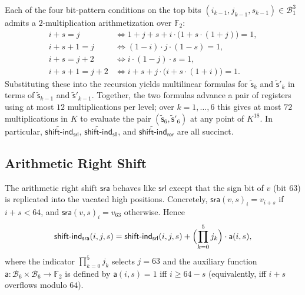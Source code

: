 \documentclass{article}
\theoremstyle{definition}
\newcommand*{\mle}{\widetilde}
\newcommand{\BB}{\mathcal{B}}
\newcommand{\FF}[1]{\mathbb{F}_{#1}}
\begin{document}
Each of the four bit-pattern conditions on the top bits $(i_{k-1}, j_{k-1}, s_{k-1}) \in \BB_1^3$ admits a $2$-multiplication arithmetization over $\FF{2}$:
\begin{align*}
  i + s = j &\iff 1 + j + s + i \cdot \bigl( 1 + s \cdot (1 + j) \bigr) = 1, \\
  i + s + 1 = j &\iff (1 - i) \cdot j \cdot (1 - s) = 1, \\
  i + s = j + 2 &\iff i \cdot (1 - j) \cdot s = 1, \\
  i + s + 1 = j + 2 &\iff i + s + j \cdot \bigl( i + s \cdot (1 + i) \bigr) = 1.
\end{align*}
Substituting these into the recursion yields multilinear formulas for $\mle{\mathsf{s}}_k$ and $\mle{\mathsf{s}}'_k$ in terms of $\mle{\mathsf{s}}_{k - 1}$ and $\mle{\mathsf{s}}'_{k - 1}$. Together, the two formulas advance a pair of registers using at most $12$ multiplications per level; over $k = 1, \ldots, 6$ this gives at most $72$ multiplications in $K$ to evaluate the pair $(\mle{\mathsf{s}}_6, \mle{\mathsf{s}}'_6)$ at any point of $K^{18}$. In particular, $\mle{\textsf{shift-ind}}_\textsf{srl}$, $\mle{\textsf{shift-ind}}_\textsf{sll}$, and $\mle{\textsf{shift-ind}}_\textsf{ror}$ are all succinct.

\subsection{Arithmetic Right Shift}
\label{sec:arithmetic-shifts}

The arithmetic right shift $\textsf{sra}$ behaves like $\textsf{srl}$ except that the sign bit of $v$ (bit $63$) is replicated into the vacated high positions. Concretely, $\textsf{sra}(v, s)_i = v_{i + s}$ if $i + s < 64$, and $\textsf{sra}(v, s)_i = v_{63}$ otherwise. Hence
\[
  \textsf{shift-ind}_\textsf{sra}(i, j, s) = \textsf{shift-ind}_\textsf{srl}(i, j, s) + \Bigl( \prod_{k = 0}^5 j_k \Bigr) \cdot \mathsf{a}(i, s),
\]
where the indicator $\prod_{k = 0}^5 j_k$ selects $j = 63$ and the auxiliary function $\mathsf{a} \colon \BB_6 \times \BB_6 \to \FF{2}$ is defined by $\mathsf{a}(i, s) = 1$ iff $i \geq 64 - s$ (equivalently, iff $i + s$ overflows modulo $64$).
\end{document}
